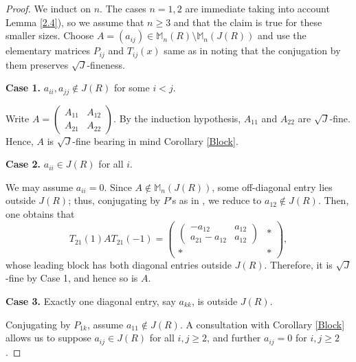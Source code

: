 \documentclass[12pt]{amsart}
\theoremstyle{definition}
\newcommand{\A}{\mathcal{A}}
\def\a{\alpha}
\begin{document}
\begin{proof}
We induct on $n$. The cases $n=1,2$ are immediate taking into account Lemma \ref{2.4}), so we assume that $n\ge 3$ and that the claim is true for these smaller sizes. Choose $A=(a_{ij})\in \mathbb{M}_n(R)\setminus \mathbb{M}_n(J(R))$ and use the elementary matrices $P_{ij}$ and $T_{ij}(x)$ same as in \cite[Theorem 2.5]{z} noting that the conjugation by them preserves $\sqrt{J}$-fineness.
	
\medskip

\noindent\textbf{Case 1.} $a_{ii},a_{jj}\notin J(R)$ for some $i<j$.

\medskip
	
Write $A=\begin{pmatrix}A_{11}&A_{12}\\A_{21}&A_{22}\end{pmatrix}$. By the induction hypothesis, $A_{11}$ and $A_{22}$ are $\sqrt{J}$-fine. Hence, $A$ is $\sqrt{J}$-fine bearing in mind Corollary \ref{Block}.
	
\medskip

\noindent\textbf{Case 2.} $a_{ii}\in J(R)$ for all $i$.

\medskip
	
We may assume $a_{ii}=0$. Since $A\not\in \mathbb{M}_n(J(R))$, some off-diagonal entry lies outside $J(R)$; thus, conjugating by $P$'s as in \cite[Theorem 2.5]{z}, we reduce to $a_{12}\not\in J(R)$. Then, one obtains that
	\[
	T_{21}(1)AT_{21}(-1)=
	\begin{pmatrix}
		\begin{pmatrix}-a_{12}&a_{12}\\a_{21}-a_{12}&a_{12}\end{pmatrix} & \ast\\
		\ast & \ast
	\end{pmatrix},
	\]
whose leading block has both diagonal entries outside $J(R)$. Therefore, it is $\sqrt{J}$-fine by Case 1, and hence so is $A$.
	
\medskip

\noindent\textbf{Case 3.} Exactly one diagonal entry, say $a_{kk}$, is outside $J(R)$.

\medskip
	
Conjugating by $P_{1k}$, assume $a_{11}\not\in J(R)$. A consultation with Corollary \ref{Block} allows us to suppose $a_{ij}\in J(R)$ for all $i,j\ge 2$, and further $a_{ij}=0$ for $i,j\ge 2$.
	

\end{proof}
\end{document}

